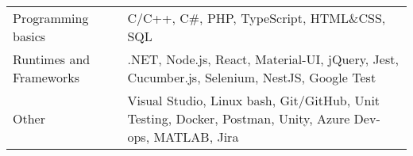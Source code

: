 

\vspace{2mm}
\begin{justify}
	\begin{tabularx}{\linewidth}{
			>{\hsize=0.8\hsize}X%
			>{\hsize=1.2\hsize}X%
		}
		Programming basics	 	& C/C++, C\#, PHP, TypeScript, HTML\&CSS, SQL \\
		Runtimes and Frameworks	& .NET, Node.js, React, Material-UI, jQuery, Jest, Cucumber.js, Selenium, NestJS, Google Test\\
		Other					& Visual Studio, Linux bash, Git/GitHub, Unit Testing, Docker, Postman, Unity, Azure Dev-ops, MATLAB, Jira
	\end{tabularx}
\end{justify}